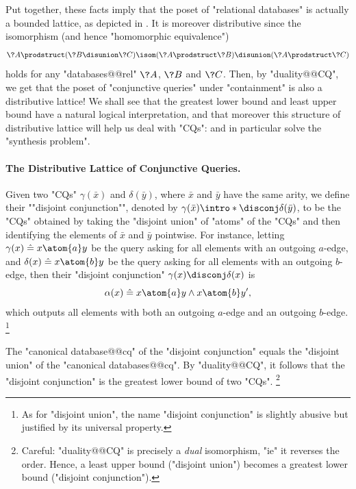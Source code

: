 Put together, these facts imply that the poset of "relational databases" is
actually a bounded lattice, as depicted in .
It is moreover distributive
since the isomorphism (and hence "homomorphic equivalence")
\[
	\?A \prodstruct (\?B \disunion \?C) \isom (\?A \prodstruct \?B) \disunion (\?A \prodstruct \?C)
\]
holds for any "databases@@rel" $\?A$, $\?B$ and $\?C$.
Then, by "duality@@CQ", we get that the poset of "conjunctive queries"
under "containment" is also a distributive lattice!
We shall see that the greatest lower bound and least upper bound
have a natural logical interpretation, and that moreover
this structure of distributive lattice will help us
deal with "CQs": and in particular
solve the "synthesis problem". 


\paragraph*{The Distributive Lattice of Conjunctive Queries.}

Given two "CQs" $\gamma(\bar x)$ and $\delta(\bar y)$,
where $\bar x$ and $\bar y$ have the same arity, we define
their \AP""disjoint conjunction"", denoted by
$\gamma(\bar x) \intro*\disconj \delta(\bar y)$,
to be the "CQs" obtained by taking the "disjoint union" of "atoms" 
of the "CQs" and then identifying the elements of $\bar x$ and $\bar y$ pointwise.
For instance, letting $\gamma(x) \defeq x \atom{a} y$ be the query
asking for all elements with an outgoing $a$-edge,
and $\delta(x) \defeq x \atom{b} y$ be the query
asking for all elements with an outgoing $b$-edge,
then their "disjoint conjunction" $\gamma(x) \disconj \delta(x)$ is
\[
	\alpha(x) \defeq x \atom{a} y \land x \atom{b} y',
\]
which outputs all elements with both an outgoing $a$-edge and an outgoing $b$-edge.%
\footnote{As for "disjoint union", the name "disjoint conjunction" is slightly abusive
but justified by its universal property.}

\begin{fact}
	The "canonical database@@cq" of the "disjoint conjunction"
	equals the "disjoint union" of the "canonical databases@@cq".
	By "duality@@CQ", it follows that
	the "disjoint conjunction" is the greatest lower bound
	of two "CQs".%
	\footnote{Careful: "duality@@CQ" is precisely a \emph{dual} isomorphism,
	"ie" it reverses the order. Hence, a least upper bound ("disjoint union")
	becomes a greatest lower bound ("disjoint conjunction").}
\end{fact}

